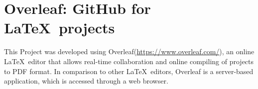 
\chapter*{Overleaf: GitHub for \LaTeX\ projects }

This Project was developed using Overleaf(\url{https://www.overleaf.com/}), an online \LaTeX\ editor that allows real-time collaboration and online compiling of projects to PDF format. In comparison to other \LaTeX\ editors, Overleaf is a server-based application, which is accessed through a web browser.



